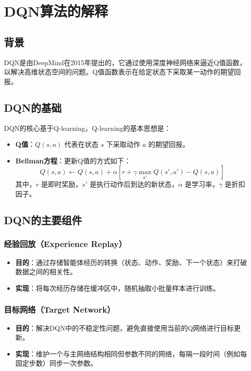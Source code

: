 \documentclass[lettersize,journal]{IEEEtran}
\begin{document}
\section{DQN算法的解释}
	\subsection{背景}
	DQN是由DeepMind在2015年提出的，它通过使用深度神经网络来逼近Q值函数，以解决高维状态空间的问题。Q值函数表示在给定状态下采取某一动作的期望回报。
	\subsection{DQN的基础}  
	DQN的核心基于Q-learning，Q-learning的基本思想是：
\begin{itemize}  
	\item \textbf{Q值}：$ Q(s, a) $ 代表在状态 $ s $ 下采取动作 $ a $ 的期望回报。  
	\item \textbf{Bellman方程}：更新Q值的方式如下：  
	\begin{equation}  
		Q(s, a) \leftarrow Q(s, a) + \alpha [r + \gamma \max_{a'} Q(s', a') - Q(s, a)]  
	\end{equation}  
	其中，$ r $ 是即时奖励，$ s' $ 是执行动作后到达的新状态，$ \alpha $ 是学习率，$ \gamma $ 是折扣因子。  
\end{itemize}  

	\subsection{DQN的主要组件}
	\subsubsection{经验回放（Experience Replay）}  
	\begin{itemize}  
		\item \textbf{目的}：通过存储智能体经历的转换（状态、动作、奖励、下一个状态）来打破数据之间的相关性。  
		\item \textbf{实现}：将每次经历存储在缓冲区中，随机抽取小批量样本进行训练。  
	\end{itemize}  
	
	\subsubsection{目标网络（Target Network）}  
	\begin{itemize}  
		\item \textbf{目的}：解决DQN中的不稳定性问题，避免直接使用当前的Q网络进行目标更新。  
		\item \textbf{实现}：维护一个与主网络结构相同但参数不同的网络，每隔一段时间（例如每固定步数）同步一次参数。  
	\end{itemize}  
	
\end{document}
